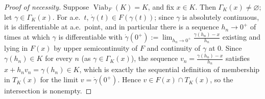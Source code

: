 \documentclass[11pt]{report}
\begin{document}
\begin{proof}[Proof of necessity]
Suppose $\operatorname{Viab}_F(K) = K$, and fix $x \in K$. Then
$\Gamma_K(x) \neq \varnothing$; let $\gamma \in \Gamma_K(x)$. For a.e.\
$t$, $\dot\gamma(t) \in F(\gamma(t))$; since $\gamma$ is absolutely
continuous, it is differentiable at a.e.\ point, and in particular there
is a sequence $h_n \to 0^+$ of times at which $\gamma$ is differentiable
with $\dot\gamma(0^+) := \lim_{h_n \to 0^+} \frac{\gamma(h_n) - x}{h_n}$
existing and lying in $F(x)$ by upper semicontinuity of $F$ and
continuity of $\gamma$ at $0$. Since $\gamma(h_n) \in K$ for every $n$
(as $\gamma \in \Gamma_K(x)$), the sequence $v_n = \frac{\gamma(h_n)-x}{h_n}$
satisfies $x + h_n v_n = \gamma(h_n) \in K$, which is exactly the
sequential definition of membership in $T_K(x)$ for the limit
$v = \dot\gamma(0^+)$. Hence $v \in F(x) \cap T_K(x)$, so the
intersection is nonempty.
\end{proof}
\end{document}
